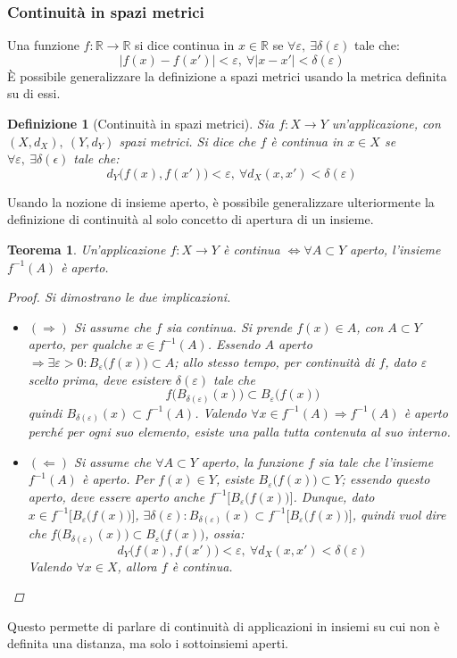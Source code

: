 \documentclass[12pt]{scrartcl}
\theoremstyle{style}
\newtheorem{definizione}{Definizione}[section]
\newtheorem{teorema}{Teorema}[section]
\numberwithin{equation}{subsection}
\begin{document}
\subsubsection{Continuit\`a in spazi metrici}
Una funzione $f:\mathbb{R}\to \mathbb{R}$ si dice continua in $x \in \mathbb{R}$ se $\forall \varepsilon , \ \exists \delta (\varepsilon )$ tale che:
\[
\lvert f(x) - f(x') \rvert < \varepsilon, \ \forall \lvert x-x' \rvert < \delta (\varepsilon )
\] 
\`E possibile generalizzare la definizione a spazi metrici usando la metrica definita su di essi.
\begin{definizione}
	[Continuit\`a in spazi metrici]
Sia $f : X\to Y$ un'applicazione, con $(X,d_X) , \ (Y,d_Y)$ spazi metrici. Si dice che $f$ \`e continua in $x \in X$ se $\forall \varepsilon , \ \exists \delta (\epsilon )$ tale che:
\begin{equation}
	d_Y \big(f(x), f(x')\big) < \varepsilon , \ \forall d_X(x,x')< \delta (\varepsilon )
\end{equation}
\end{definizione}
\noindent Usando la nozione di insieme aperto, \`e possibile generalizzare ulteriormente la definizione di continuit\`a al solo concetto di apertura di un insieme.
\begin{teorema}
Un'applicazione $f:X\to Y$ \`e continua $\iff\forall A \subset  Y$ aperto, l'insieme $f^{-1}(A)  $ \`e aperto.
\begin{proof}
Si dimostrano le due implicazioni.	
\begin{itemize}
	\item $(\Rightarrow )$ Si assume che $f$ sia continua. Si prende $f(x) \in A$, con $A\subset Y$ aperto, per qualche $x \in f^{-1} (A)$. Essendo $A$ aperto $\Rightarrow \exists \varepsilon >0 : B_\varepsilon \big(f(x)\big)\subset A$; allo stesso tempo, per continuit\`a di $f$, dato $\varepsilon $ scelto prima, deve esistere $\delta (\varepsilon )$ tale che
		\[
		f\big(B_{\delta (\varepsilon )}(x)\big) \subset B_\varepsilon \big(f(x)\big)
		\] 
	quindi $B_{\delta (\varepsilon )} (x) \subset f^{-1} (A)$. Valendo $\forall x \in f^{-1} (A)\Rightarrow f^{-1} (A)$ \`e aperto perch\'e per ogni suo elemento, esiste una palla tutta contenuta al suo interno.
\item $(\Leftarrow)$ Si assume che $\forall A \subset Y$ aperto, la funzione $f$ sia tale che l'insieme $f^{-1} (A)$ \`e aperto. Per $f(x) \in Y$, esiste $B_\varepsilon \big(f(x)\big) \subset Y$; essendo questo aperto, deve essere aperto anche $f^{-1} \big[B_\varepsilon \big(f(x)\big) \big]$. 
	Dunque, dato $x \in f^{-1} \big[B_\varepsilon \big(f(x)\big) \big] $, $\exists \delta (\varepsilon ) : B_{\delta (\varepsilon )} (x) \subset f^{-1} \big[B_\varepsilon \big(f(x)\big) \big]$, quindi vuol dire che $f\big(B_{\delta (\varepsilon )} (x)\big)\subset B_\varepsilon \big(f(x)\big)$, ossia:
	\[
	d_Y\big(f(x), f(x')\big) < \varepsilon , \ \forall d_X (x,x') < \delta (\varepsilon )
	\] 
Valendo $\forall x \in X$, allora $f$ \`e continua.
\end{itemize}
\end{proof}
\end{teorema}
\noindent Questo permette di parlare di continuit\`a di applicazioni in insiemi su cui non \`e definita una distanza, ma solo i sottoinsiemi aperti.
\end{document}
